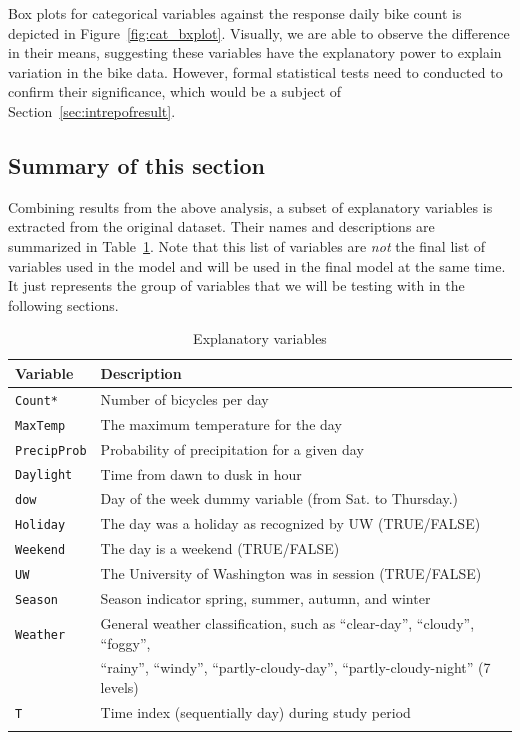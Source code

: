 \documentclass [11pt, proquest] {uwthesis}[2015/03/03]
\begin{document}
Box plots for categorical variables against the response daily bike count is depicted in Figure~\ref{fig:cat_bxplot}. Visually, we are able to observe the difference in their means, suggesting these variables have the explanatory power to explain variation in the bike data. However, formal statistical tests need to conducted to confirm their significance, which would be a subject of Section~\ref{sec:intrepofresult}.

\subsection{Summary of this section}

Combining results from the above analysis, a subset of explanatory variables is extracted from the original dataset. Their names and descriptions are summarized in Table~\ref{tb:variables}. Note that this list of variables are \emph{not} the final list of variables used in the model and will be used in the final model at the same time. It just represents the group of variables that we will be testing with in the following sections. 

\begin{table}
\begin{center}
\caption{Explanatory variables}
\vspace{10pt}
\begin{tabular}{l l} 
 \hline
Variable & Description \\
\hline
\texttt{Count*} & Number of bicycles per day \\
\texttt{MaxTemp} & The maximum temperature for the day \\
\texttt{PrecipProb} & Probability of precipitation for a given day \\
\texttt{Daylight} & Time from dawn to dusk in hour\\
\texttt{dow} & Day of the week dummy variable (from Sat. to Thursday.) \\
\texttt{Holiday} & The day was a holiday as recognized by UW (TRUE/FALSE) \\
\texttt{Weekend} & The day is a weekend (TRUE/FALSE) \\
\texttt{UW} & The University of Washington was in session (TRUE/FALSE) \\
\texttt{Season} & Season indicator spring, summer, autumn, and winter \\
\texttt{Weather} & General weather classification, such as ``clear-day'', ``cloudy'', ``foggy'', \\
 & ``rainy'', ``windy'', ``partly-cloudy-day'', ``partly-cloudy-night'' (7 levels)\\
\texttt{T}  & Time index (sequentially day) during study period \\
\hline
\label{tb:variables}
\end{tabular}
\end{center}
\end{table}
\end{document}
